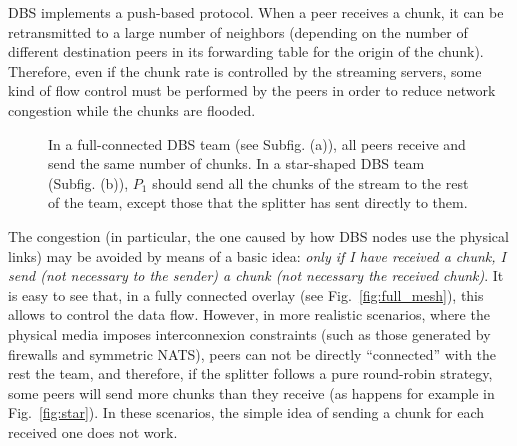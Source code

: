 

\label{sec:chunk_flooding}

\begin{comment}
\begin{figure*}
  \imgw{300}{graphics/peer_chunk_flooding.svg}
  \caption{Chunk flooding at peers.\label{fig:peer_chunk_flooding}}
\end{figure*}
\end{comment}

DBS implements a push-based protocol. When a peer receives a chunk, it
can be retransmitted to a large number of neighbors (depending on the
number of different destination peers in its forwarding table for the
origin of the chunk). Therefore, even if the chunk rate is controlled
by the streaming servers, some kind of flow control must be performed
by the peers in order to reduce network congestion while the chunks
are flooded.


\begin{figure*}
  \centering
  \quad
  \caption{In a full-connected DBS team (see Subfig. (a)), all peers
    receive and send the same number of chunks. In a star-shaped DBS
    team (Subfig. (b)), $P_1$ should send all the chunks of the stream
    to the rest of the team, except those that the splitter has sent
    directly to them.}
\end{figure*}

The congestion (in particular, the one caused by how DBS nodes use the
physical links) may be avoided by means of a basic idea: \textit{only
  if I have received a chunk, I send (not necessary to the sender) a
  chunk (not necessary the received chunk)}. It is easy to see that,
in a fully connected overlay (see Fig.~\ref{fig:full_mesh}), this
allows to control the data flow. However, in more realistic scenarios,
where the physical media imposes interconnexion constraints (such as
those generated by firewalls and symmetric NATS), peers can not be
directly ``connected'' with the rest the team, and therefore, if the
splitter follows a pure round-robin strategy, some peers will send
more chunks than they receive (as happens for example in
Fig.~\ref{fig:star}). In these scenarios, the simple idea of sending a
chunk for each received one does not work.


